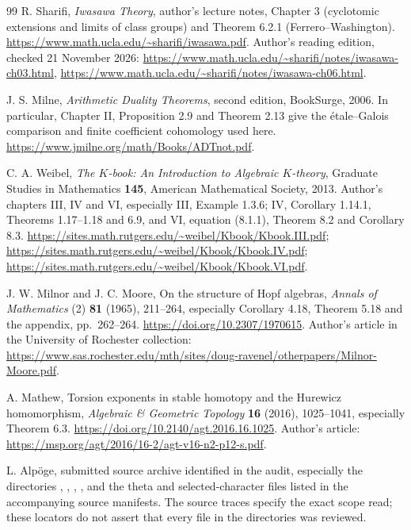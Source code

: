 \documentclass[11pt,a4paper]{article}
\theoremstyle{remark}
\begin{document}
\begin{thebibliography}{99}
R. Sharifi, \emph{Iwasawa Theory}, author's lecture notes,
Chapter 3 (cyclotomic extensions and limits of class groups) and
Theorem 6.2.1 (Ferrero--Washington).
\url{https://www.math.ucla.edu/~sharifi/iwasawa.pdf}.
Author's reading edition, checked 21 November 2026:
\url{https://www.math.ucla.edu/~sharifi/notes/iwasawa-ch03.html},
\url{https://www.math.ucla.edu/~sharifi/notes/iwasawa-ch06.html}.

J. S. Milne, \emph{Arithmetic Duality Theorems}, second edition,
BookSurge, 2006. In particular, Chapter II, Proposition 2.9
and Theorem 2.13 give the \'etale--Galois comparison and finite
coefficient cohomology used here.
\url{https://www.jmilne.org/math/Books/ADTnot.pdf}.

C. A. Weibel, \emph{The $K$-book: An Introduction to Algebraic $K$-theory},
Graduate Studies in Mathematics \textbf{145}, American Mathematical
Society, 2013. Author's chapters III, IV and VI, especially III,
Example 1.3.6; IV,
Corollary 1.14.1, Theorems 1.17--1.18 and 6.9, and VI,
equation (8.1.1), Theorem 8.2 and Corollary 8.3.
\url{https://sites.math.rutgers.edu/~weibel/Kbook/Kbook.III.pdf};
\url{https://sites.math.rutgers.edu/~weibel/Kbook/Kbook.IV.pdf};
\url{https://sites.math.rutgers.edu/~weibel/Kbook/Kbook.VI.pdf}.

J. W. Milnor and J. C. Moore, On the structure of Hopf algebras,
\emph{Annals of Mathematics} (2) \textbf{81} (1965), 211--264,
especially Corollary 4.18, Theorem 5.18 and the appendix,
pp.\ 262--264.
\url{https://doi.org/10.2307/1970615}.
Author's article in the University of Rochester collection:
\url{https://www.sas.rochester.edu/mth/sites/doug-ravenel/otherpapers/Milnor-Moore.pdf}.

A. Mathew, Torsion exponents in stable homotopy and the Hurewicz
homomorphism, \emph{Algebraic \& Geometric Topology}
\textbf{16} (2016), 1025--1041, especially Theorem 6.3.
\url{https://doi.org/10.2140/agt.2016.16.1025}.
Author's article:
\url{https://msp.org/agt/2016/16-2/agt-v16-n2-p12-s.pdf}.

L. Alp\"oge, submitted source archive identified in the audit,
especially the directories
,
,
,
, and the theta and
selected-character files listed in the accompanying source manifests.
The source traces specify the exact scope read; these locators do not
assert that every file in the directories was reviewed.


\end{thebibliography}
\end{document}
